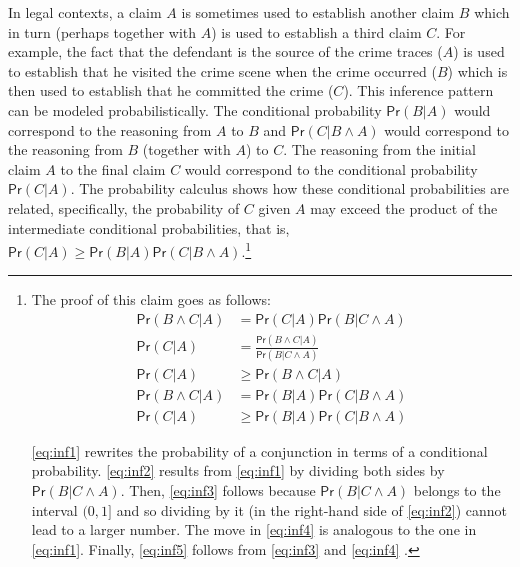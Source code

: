 \documentclass{article}
\newcommand{\pr}{\mathsf{Pr}}
\begin{document}
In legal contexts, a claim $A$ is sometimes used to establish another claim $B$ which in turn (perhaps together with $A$) is used to establish a third claim $C$. For example, the fact that the defendant is the source of the crime traces ($A$) is used to establish that he visited the crime scene when the crime occurred ($B$) which is then used to establish that he committed the crime ($C$). This inference pattern can be modeled  probabilistically. The conditional probability $\pr(B \vert A)$ would correspond to the reasoning  from $A$ to $B$ and $\pr(C \vert B\wedge A)$ would correspond to the reasoning  from $B$ (together with $A$) to $C$. The reasoning from the initial claim $A$ to the final claim $C$ would correspond to the conditional probability $\pr(C \vert A)$. %
The probability calculus shows how these conditional probabilities are related, specifically,  the probability of $C$ given $A$ may exceed the product of the intermediate conditional probabilities, that is, $\pr(C \vert A)\geq \pr(B \vert A)\pr(C \vert B \wedge A)$.\footnote{The proof of this claim goes as follows:
\begin{align}
\label{eq:inf1} \pr(B \wedge C \vert A) &  = \pr(C\vert A)\pr(B\vert C\wedge A) \\
\label{eq:inf2}
\pr(C\vert A) & = \frac{\pr(B \wedge C \vert A)}{\pr(B\vert C\wedge A)}\\
\label{eq:inf3}	\pr(C\vert A) & \geq 	\pr(B \wedge C \vert A) \\
\label{eq:inf4}
	\pr(B \wedge C \vert A) & = \pr(B \vert A) \pr(C\vert B \wedge A) \\
\label{eq:inf5}
	\pr(C\vert A) &  \geq  \pr(B \vert A) \pr(C\vert B \wedge A) 
	\end{align}

\noindent 
\eqref{eq:inf1} rewrites the probability of a conjunction in terms of a conditional probability. %
\eqref{eq:inf2} results from \eqref{eq:inf1} by dividing both sides by $\pr(B\vert C\wedge A)$. Then, \eqref{eq:inf3} follows because $\pr(B\vert C\wedge A)$ belongs to the interval $(0,1]$ and so dividing by it (in the right-hand side of \eqref{eq:inf2}) cannot lead to a larger number. The move in \eqref{eq:inf4} is analogous to the one in \eqref{eq:inf1}. %
Finally,   \eqref{eq:inf5} follows from \eqref{eq:inf3} and \eqref{eq:inf4} \cite[p.\ 69]{Cohen1977The-probable-an}.}
\end{document}
